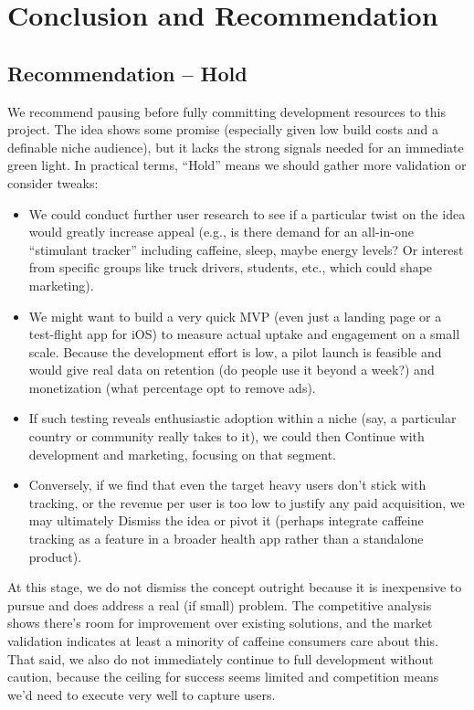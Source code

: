 \documentclass{article}
\begin{document}
\section{Conclusion and Recommendation}
\subsection{Recommendation – Hold}
We recommend pausing before fully committing development resources to this project. The idea shows some promise (especially given low build costs and a definable niche audience), but it lacks the strong signals needed for an immediate green light. In practical terms, “Hold” means we should gather more validation or consider tweaks:

\begin{itemize}
    \item We could conduct further user research to see if a particular twist on the idea would greatly increase appeal (e.g., is there demand for an all-in-one “stimulant tracker” including caffeine, sleep, maybe energy levels? Or interest from specific groups like truck drivers, students, etc., which could shape marketing).
    \item We might want to build a very quick MVP (even just a landing page or a test-flight app for iOS) to measure actual uptake and engagement on a small scale. Because the development effort is low, a pilot launch is feasible and would give real data on retention (do people use it beyond a week?) and monetization (what percentage opt to remove ads).
    \item If such testing reveals enthusiastic adoption within a niche (say, a particular country or community really takes to it), we could then Continue with development and marketing, focusing on that segment.
    \item Conversely, if we find that even the target heavy users don’t stick with tracking, or the revenue per user is too low to justify any paid acquisition, we may ultimately Dismiss the idea or pivot it (perhaps integrate caffeine tracking as a feature in a broader health app rather than a standalone product).
\end{itemize}

At this stage, we do not dismiss the concept outright because it is inexpensive to pursue and does address a real (if small) problem. The competitive analysis shows there’s room for improvement over existing solutions, and the market validation indicates at least a minority of caffeine consumers care about this. That said, we also do not immediately continue to full development without caution, because the ceiling for success seems limited and competition means we’d need to execute very well to capture users.
\end{document}

